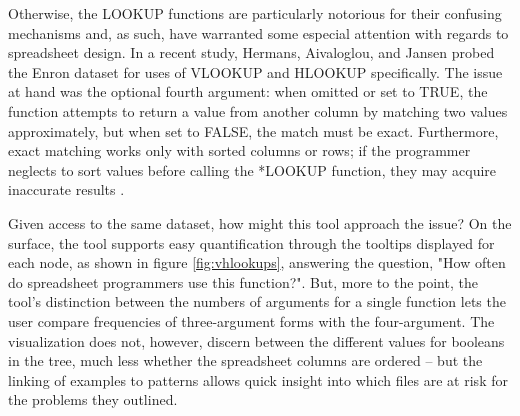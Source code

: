 \documentclass[conference]{IEEEtran}
\begin{document}
	Otherwise, the LOOKUP functions are particularly notorious for their confusing
	mechanisms and, as such, have warranted some especial attention with regards to
	spreadsheet design. In a recent study, Hermans, Aivaloglou, and Jansen probed
	the Enron dataset for uses of VLOOKUP and HLOOKUP specifically. The issue at
	hand was the optional fourth argument: when omitted or set to TRUE, the
	function attempts to return a value from another column by matching two values
	approximately, but when set to FALSE, the match must be exact. Furthermore,
	exact matching works only with sorted columns or rows; if the programmer
	neglects to sort values before calling the *LOOKUP function, they may acquire
	inaccurate results \cite{hermans2015detecting}. \par
	
	Given access to the same dataset, how might this tool approach the issue? On
	the surface, the tool supports easy quantification through the tooltips
	displayed for each node, as shown in figure \ref{fig:vhlookups}, answering the
	question, "How often do spreadsheet programmers use this function?". But, more
	to the point, the tool's distinction between the numbers of arguments for a
	single function lets the user compare frequencies of three-argument forms with
	the four-argument. The visualization does not, however, discern between the
	different values for booleans in the tree, much less whether the spreadsheet
	columns are ordered -- but the linking of examples to patterns allows quick
	insight into which files are at risk for the problems they outlined. \par
	
\end{document}
